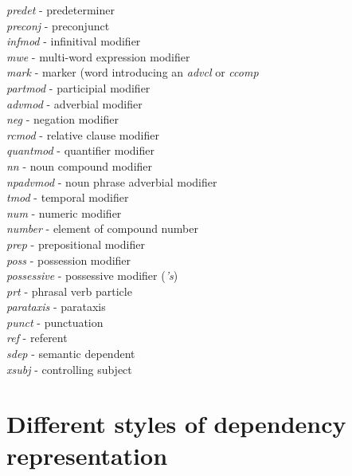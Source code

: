 \documentclass[11pt,letter]{article}
\begin{document}
\begin{tabbing}
    \> \> \emph{predet} - predeterminer\\
    \> \> \emph{preconj} - preconjunct \\
    \> \> \emph{infmod} - infinitival modifier \\
    \> \> \emph{mwe} - multi-word expression modifier \\
    \> \> \> \emph{mark} - marker (word introducing an \emph{advcl} or
    \emph{ccomp} \\
    \> \> \emph{partmod} - participial modifier \\
    \> \> \emph{advmod} - adverbial modifier \\
    \> \>  \> \emph{neg} - negation modifier \\
    \> \> \emph{rcmod} - relative clause modifier \\
    \> \> \emph{quantmod} - quantifier modifier\\
   \> \> \emph{nn} - noun compound modifier \\
    \> \> \emph{npadvmod} - noun phrase adverbial modifier\\
	\> \> \> \emph{tmod} - temporal modifier \\
    \> \> \emph{num} - numeric modifier \\
    \> \> \emph{number} - element of compound number \\
    \> \> \emph{prep} - prepositional modifier \\
    \> \> \emph{poss} - possession modifier \\
    \> \> \emph{possessive} - possessive modifier (\emph{'s}) \\
    \> \> \emph{prt} - phrasal verb particle \\
\> \emph{parataxis} - parataxis \\
\> \emph{punct} - punctuation\\
\> \emph{ref} - referent \\
\> \emph{sdep} - semantic dependent \\
    \> \> \emph{xsubj} - controlling subject \\
\end{tabbing}


\section{Different styles of dependency representation}\label{types}
\end{document}

